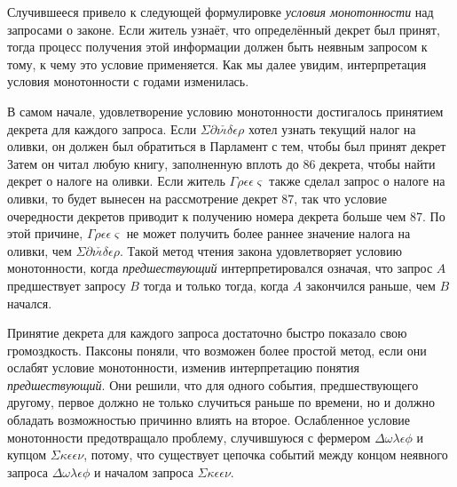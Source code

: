 \documentclass[12pt, a4paper]{article} %
\begin{document}
Случившееся привело к следующей формулировке \textit{условия монотонности} над запросами о законе.
Если житель узнаёт, что определённый декрет был принят, тогда процесс получения этой информации должен быть неявным запросом к тому, к чему это условие применяется. Как мы далее увидим, интерпретация условия монотонности с годами изменилась.

В самом начале, удовлетворение условию монотонности достигалось принятием декрета для каждого запроса. Если $\Sigma\partial\nu\check{\iota}\delta\epsilon\rho$ хотел узнать текущий налог на оливки, он должен был обратиться в Парламент с тем, чтобы был принят декрет 
Затем он читал любую книгу, заполненную вплоть до 86 декрета, чтобы найти декрет о налоге на оливки. Если житель $\Gamma\rho\epsilon\epsilon\varsigma$ также сделал запрос о налоге на оливки, то будет вынесен на рассмотрение декрет 87, так что условие очередности декретов приводит к получению номера декрета больше чем 87. По этой причине, $\Gamma\rho\epsilon\epsilon\varsigma$ не может получить более раннее значение налога на оливки, чем $\Sigma\partial\nu\check{\iota}\delta\epsilon\rho$. Такой метод чтения закона удовлетворяет условию монотонности, когда \textit{предшествующий} интерпретировался означая, что запрос $A$ предшествует запросу $B$ тогда и только тогда, когда $A$ закончился раньше, чем $B$ начался.

Принятие декрета для каждого запроса достаточно быстро показало свою громоздкость. Паксоны поняли, что возможен более простой метод, если они ослабят условие монотонности, изменив интерпретацию понятия \textit{предшествующий}. Они решили, что для одного события, предшествующего другому, первое должно не только случиться раньше по времени, но и должно обладать возможностью причинно влиять на второе. Ослабленное условие монотонности предотвращало проблему, случившуюся с фермером $\Delta\omega\lambda\epsilon\phi$ и купцом $\Sigma\kappa\epsilon\epsilon\nu$, потому, что существует цепочка событий между концом неявного запроса $\Delta\omega\lambda\epsilon\phi$ и началом запроса $\Sigma\kappa\epsilon\epsilon\nu$. 
\end{document}
